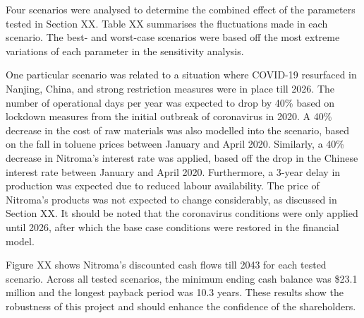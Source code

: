 Four scenarios were analysed to determine the combined effect of the parameters tested in Section XX. Table XX summarises the fluctuations made in each scenario. The best- and worst-case scenarios were based off the most extreme variations of each parameter in the sensitivity analysis. 



One particular scenario was related to a situation where COVID-19 resurfaced in Nanjing, China, and strong restriction measures were in place till 2026. The number of operational days per year was expected to drop by 40\% based on lockdown measures from the initial outbreak of coronavirus in 2020. A 40\% decrease in the cost of raw materials was also modelled into the scenario, based on the fall in toluene prices between January and April 2020. Similarly, a 40\% decrease in Nitroma’s interest rate was applied, based off the drop in the Chinese interest rate between January and April 2020. Furthermore, a 3-year delay in production was expected due to reduced labour availability. The price of Nitroma’s products was not expected to change considerably, as discussed in Section XX. It should be noted that the coronavirus conditions were only applied until 2026, after which the base case conditions were restored in the financial model.


Figure XX shows Nitroma’s discounted cash flows till 2043 for each tested scenario. Across all tested scenarios, the minimum ending cash balance was \$23.1 million and the longest payback period was 10.3 years. These results show the robustness of this project and should enhance the confidence of the shareholders.
